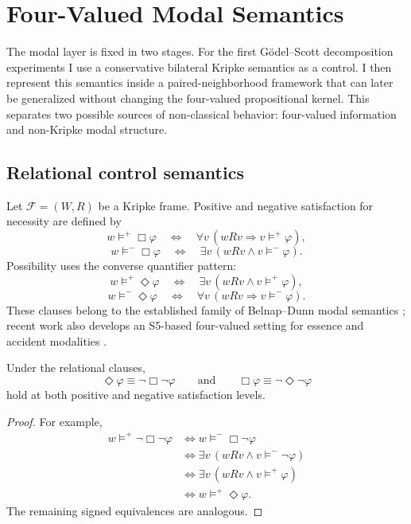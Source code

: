 \section{Four-Valued Modal Semantics}
\label{sec:modal}

\statusestablished

The modal layer is fixed in two stages. For the first G\"odel--Scott decomposition experiments I use a conservative bilateral Kripke semantics as a control. I then represent this semantics inside a paired-neighborhood framework that can later be generalized without changing the four-valued propositional kernel. This separates two possible sources of non-classical behavior: four-valued information and non-Kripke modal structure.

\subsection{Relational control semantics}

Let \(\mathcal F=(W,R)\) be a Kripke frame. Positive and negative satisfaction for necessity are defined by
\[
  w\models^{+}\Box\varphi
  \quad\Longleftrightarrow\quad
  \forall v\,(wRv\Rightarrow v\models^{+}\varphi),
\]
\[
  w\models^{-}\Box\varphi
  \quad\Longleftrightarrow\quad
  \exists v\,(wRv\land v\models^{-}\varphi).
\]
Possibility uses the converse quantifier pattern:
\[
  w\models^{+}\Diamond\varphi
  \quad\Longleftrightarrow\quad
  \exists v\,(wRv\land v\models^{+}\varphi),
\]
\[
  w\models^{-}\Diamond\varphi
  \quad\Longleftrightarrow\quad
  \forall v\,(wRv\Rightarrow v\models^{-}\varphi).
\]
These clauses belong to the established family of Belnap--Dunn modal semantics \cite{OdintsovWansing2010,RivieccioJungJansana2017}; recent work also develops an S5-based four-valued setting for essence and accident modalities \cite{Petrukhin2026}.

\begin{proposition}
Under the relational clauses,
\[
  \Diamond\varphi\equiv\neg\Box\neg\varphi
  \qquad\text{and}\qquad
  \Box\varphi\equiv\neg\Diamond\neg\varphi
\]
hold at both positive and negative satisfaction levels.
\end{proposition}
\begin{proof}
For example,
\begin{align*}
  w\models^{+}\neg\Box\neg\varphi
  &\Longleftrightarrow w\models^{-}\Box\neg\varphi\\
  &\Longleftrightarrow \exists v\,(wRv\land v\models^{-}\neg\varphi)\\
  &\Longleftrightarrow \exists v\,(wRv\land v\models^{+}\varphi)\\
  &\Longleftrightarrow w\models^{+}\Diamond\varphi.
\end{align*}
The remaining signed equivalences are analogous.
\end{proof}

